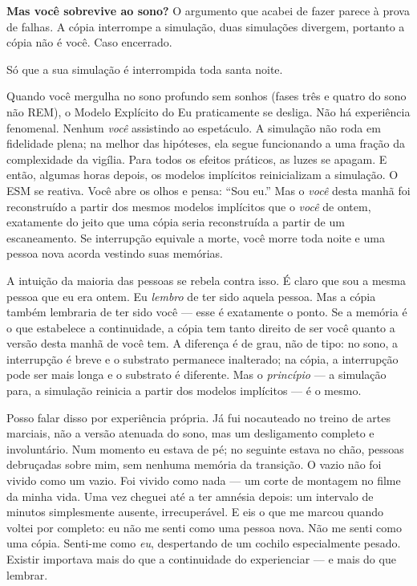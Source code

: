 \documentclass[11pt, twoside, openright]{book}
\begin{document}
\textbf{Mas você sobrevive ao sono?} O argumento que acabei de fazer parece à prova de falhas. A cópia interrompe a simulação, duas simulações divergem, portanto a cópia não é você. Caso encerrado.

Só que a sua simulação é interrompida toda santa noite.

Quando você mergulha no sono profundo sem sonhos (fases três e quatro do sono não REM), o Modelo Explícito do Eu praticamente se desliga. Não há experiência fenomenal. Nenhum \textit{você} assistindo ao espetáculo. A simulação não roda em fidelidade plena; na melhor das hipóteses, ela segue funcionando a uma fração da complexidade da vigília. Para todos os efeitos práticos, as luzes se apagam. E então, algumas horas depois, os modelos implícitos reinicializam a simulação. O ESM se reativa. Você abre os olhos e pensa: ``Sou eu.'' Mas o \textit{você} desta manhã foi reconstruído a partir dos mesmos modelos implícitos que o \textit{você} de ontem, exatamente do jeito que uma cópia seria reconstruída a partir de um escaneamento. Se interrupção equivale a morte, você morre toda noite e uma pessoa nova acorda vestindo suas memórias.

A intuição da maioria das pessoas se rebela contra isso. É claro que sou a mesma pessoa que eu era ontem. Eu \textit{lembro} de ter sido aquela pessoa. Mas a cópia também lembraria de ter sido você --- esse é exatamente o ponto. Se a memória é o que estabelece a continuidade, a cópia tem tanto direito de ser você quanto a versão desta manhã de você tem. A diferença é de grau, não de tipo: no sono, a interrupção é breve e o substrato permanece inalterado; na cópia, a interrupção pode ser mais longa e o substrato é diferente. Mas o \textit{princípio} --- a simulação para, a simulação reinicia a partir dos modelos implícitos --- é o mesmo.

Posso falar disso por experiência própria. Já fui nocauteado no treino de artes marciais, não a versão atenuada do sono, mas um desligamento completo e involuntário. Num momento eu estava de pé; no seguinte estava no chão, pessoas debruçadas sobre mim, sem nenhuma memória da transição. O vazio não foi vivido como um vazio. Foi vivido como nada --- um corte de montagem no filme da minha vida. Uma vez cheguei até a ter amnésia depois: um intervalo de minutos simplesmente ausente, irrecuperável. E eis o que me marcou quando voltei por completo: eu não me senti como uma pessoa nova. Não me senti como uma cópia. Senti-me como \textit{eu}, despertando de um cochilo especialmente pesado. Existir importava mais do que a continuidade do experienciar --- e mais do que lembrar.
\end{document}

